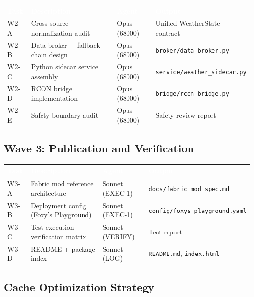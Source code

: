 \documentclass[11pt,letterpaper]{article}
\newcommand{\tableheader}[1]{\textbf{\sffamily\textcolor{white}{#1}}}
\begin{document}
\begin{center}
\begin{tabularx}{\textwidth}{L{2cm}L{5cm}L{2cm}X}
\toprule
{}
\tableheader{Task} & \tableheader{Description} & \tableheader{Agent} & \tableheader{Output} \\
\midrule
W2-A & Cross-source normalization audit & Opus (68000) & Unified WeatherState contract \\
W2-B & Data broker + fallback chain design & Opus (68000) & \texttt{broker/data\_broker.py} \\
W2-C & Python sidecar service assembly & Opus (68000) & \texttt{service/weather\_sidecar.py} \\
W2-D & RCON bridge implementation & Opus (68000) & \texttt{bridge/rcon\_bridge.py} \\
W2-E & Safety boundary audit & Opus (68000) & Safety review report \\
\bottomrule
\end{tabularx}
\end{center}

\subsection{Wave 3: Publication and Verification}

\begin{center}
\begin{tabularx}{\textwidth}{L{2cm}L{5cm}L{2cm}X}
\toprule
{}
\tableheader{Task} & \tableheader{Description} & \tableheader{Agent} & \tableheader{Output} \\
\midrule
W3-A & Fabric mod reference architecture & Sonnet (EXEC-1) & \texttt{docs/fabric\_mod\_spec.md} \\
W3-B & Deployment config (Foxy's Playground) & Sonnet (EXEC-1) & \texttt{config/foxys\_playground.yaml} \\
W3-C & Test execution + verification matrix & Sonnet (VERIFY) & Test report \\
W3-D & README + package index & Sonnet (LOG) & \texttt{README.md}, \texttt{index.html} \\
\bottomrule
\end{tabularx}
\end{center}

\subsection{Cache Optimization Strategy}
\end{document}
